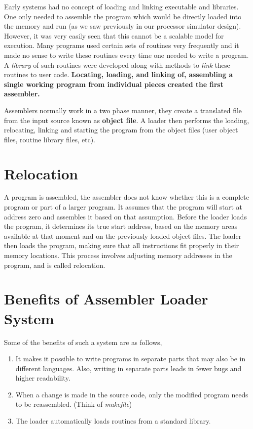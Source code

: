 Early systems had no concept of loading and linking executable and libraries. One only needed to assemble the program which would be directly loaded into the memory and run (as we saw previously in our processor simulator design). However, it was very easily seen that this cannot be a scalable model for execution. Many programs used certain sets of routines very frequently and it made no sense to write these routines every time one needed to write a program. A \textit{library} of such routines were developed along with methods to \textit{link} these routines to user code.
\textbf{Locating, loading, and linking of, assembling a single working program from individual pieces created the first assembler.}

Assemblers normally work in a two phase manner, they create a translated file from the input source known as \textbf{object file}. A loader then performs the loading, relocating, linking and starting the program from the object files (user object files, routine library files, etc).

\section{Relocation}

A program is assembled, the assembler does not know whether this is a complete program or part of a larger program. It assumes that the program will start at address zero and assembles it based on that assumption. Before the loader loads the program, it determines its true start address, based on the memory areas available at that moment and on the previously loaded object files. The loader then loads the program, making sure that all instructions fit properly in their memory locations. This process involves adjusting memory addresses in the program, and is called relocation.

\section{Benefits of Assembler Loader System}
Some of the benefits of such a system are as follows,

\begin{enumerate}
\item It makes it possible to write programs in separate parts that may also be in
different languages. Also, writing in separate parts leads in fewer bugs and higher readability.
\item When a change is made in the source code, only the modified program needs to
be reassembled. (Think of \textit{makefile})
\item The loader automatically loads routines from a standard library.
\end{enumerate}

